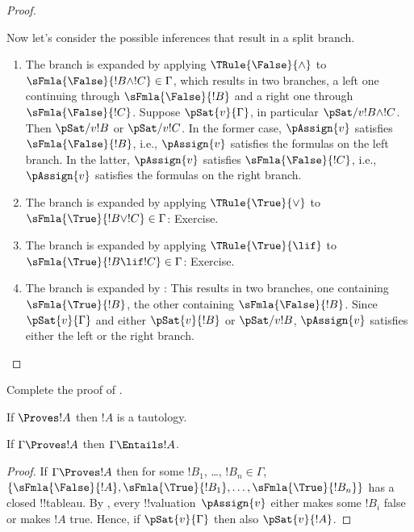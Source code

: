 \begin{proof}
\begin{enumerate}
\end{enumerate}
Now let's consider the possible inferences that result in a split branch.
\begin{enumerate}
\item The branch is expanded by applying $\TRule{\False}{\land}$ to
  $\sFmla{\False}{!B \land !C} \in \Gamma$, which results in two
  branches, a left one continuing through $\sFmla{\False}{!B}$ and a
  right one through $\sFmla{\False}{!C}$. Suppose
  $\pSat{v}{\Gamma}$, in particular
  $\pSat/{v}{!B \land !C}$.  Then
  $\pSat/{v}{!B}$ or
  $\pSat/{v}{!C}$. In the former case,
  $\pAssign{v}$ satisfies
  $\sFmla{\False}{!B}$, i.e., $\pAssign{v}$
  satisfies the formulas on the left branch. In the latter,
  $\pAssign{v}$ satisfies
  $\sFmla{\False}{!C}$, i.e., $\pAssign{v}$
  satisfies the formulas on the right branch.
\item The branch is expanded by applying $\TRule{\True}{\lor}$ to
  $\sFmla{\True}{!B \lor !C} \in \Gamma$: Exercise.
\item The branch is expanded by applying $\TRule{\True}{\lif}$ to
  $\sFmla{\True}{!B \lif !C} \in \Gamma$: Exercise.
\item The branch is expanded by \Cut: This results in two branches,
  one containing $\sFmla{\True}{!B}$, the other containing
  $\sFmla{\False}{!B}$. Since $\pSat{v}{\Gamma}$
  and either $\pSat{v}{!B}$ or
  $\pSat/{v}{!B}$,
  $\pAssign{v}$ satisfies either the left or
  the right branch.
\end{enumerate}
\end{proof}




\begin{prob}
Complete the proof of .
\end{prob}


\begin{cor}
If $\Proves !A$ then $!A$ is a tautology.
\end{cor}

\begin{cor}
If $\Gamma \Proves !A$ then $\Gamma \Entails !A$.
\end{cor}

\begin{proof}
  If $\Gamma \Proves !A$ then for some $!B_1$, \dots, $!B_n \in
  \Gamma$, $\{\sFmla{\False}{!A}, \sFmla{\True}{!B_1}, \dots,
  \sFmla{\True}{!B_n}\}$ has a closed !!{tableau}. By
  , every
  !!{valuation}~$\pAssign{v}$
  either makes some $!B_i$ false or makes $!A$ true.  Hence, if
  $\pSat{v}{\Gamma}$ then also
  $\pSat{v}{!A}$.
\end{proof}

